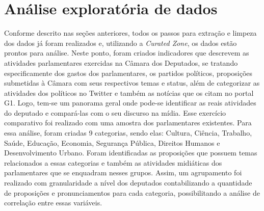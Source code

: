 \section{Análise exploratória de dados} Conforme descrito nas seções anteriores, todos os passos para extração e limpeza dos dados já foram realizados e, utilizando a \textit{Curated Zone}, os dados estão prontos para análise. Neste ponto, foram criados indicadores que descrevem as atividades parlamentares exercidas na Câmara dos Deputados, se tratando especificamente dos gastos dos parlamentares, os partidos políticos, proposições submetidas à Câmara com seus respectivos temas e status, além de categorizar as atividades dos políticos no Twitter e também as notícias que os citam no portal G1. Logo, tem-se um panorama geral onde pode-se identificar as reais atividades do deputado e compará-las com o seu discurso na mídia. Esse exercício comparativo foi realizado com uma amostra dos parlamentares existentes. Para essa análise, foram criadas 9 categorias, sendo elas: Cultura, Ciência, Trabalho, Saúde, Educação, Economia, Segurança Pública, Direitos Humanos e Desenvolvimento Urbano. Foram identificadas as proposições que possuem temas relacionados a essas categorias e também as atividades midiáticas dos parlamentares que se enquadram nesses grupos. Assim, um agrupamento foi realizado com granularidade a nível dos deputados contabilizando a quantidade de proposições e pronunciamentos para cada categoria, possibilitando a análise de correlação entre essas variáveis.